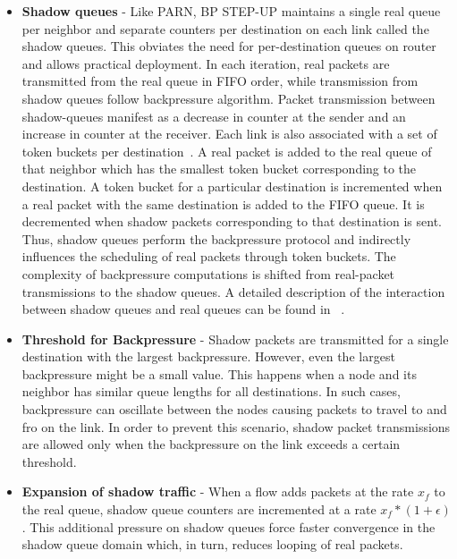 \begin{itemize}[leftmargin=*]
\item[] \textbf{Shadow queues} - Like PARN, BP STEP-UP maintains a single real queue per neighbor and separate counters per destination on each link called the shadow queues. This obviates the need for per-destination queues on router and allows practical deployment. In each iteration, real packets are transmitted from the real queue in FIFO order, while transmission from shadow queues follow backpressure algorithm. Packet transmission between shadow-queues manifest as a decrease in counter at the sender and an increase in counter at the receiver. Each link is also associated with a set of token buckets per destination~\cite{Srikant3}. A real packet is added to the real queue of that neighbor which has the smallest token bucket corresponding to the destination. A token bucket for a particular destination is incremented when a real packet with the same destination is added to the FIFO queue. It is decremented when shadow packets corresponding to that destination is sent. Thus, shadow queues perform the backpressure protocol and indirectly influences the scheduling of real packets through token buckets. The complexity of backpressure computations is shifted from real-packet transmissions to the shadow queues. A detailed description of the interaction between shadow queues and real queues can be found in ~\cite{Srikant3}.

\item[] \textbf{Threshold for Backpressure} - Shadow packets are transmitted for a single destination with the largest backpressure. However, even the largest backpressure might be a small value. This happens when a node and its neighbor has similar queue lengths for all destinations. In such cases, backpressure can oscillate between the nodes causing packets to travel to and fro on the link. In order to prevent this scenario, shadow packet transmissions are allowed only when the backpressure on the link exceeds a certain threshold.

\item[] \textbf{Expansion of shadow traffic} - When a flow adds packets at the rate $x_{f}$ to the real queue, shadow queue counters are incremented at a rate $ x_{f} * (1+\epsilon)$. This additional pressure on shadow queues force faster convergence in the shadow queue domain which, in turn, reduces looping of real packets. 


\end{itemize}
